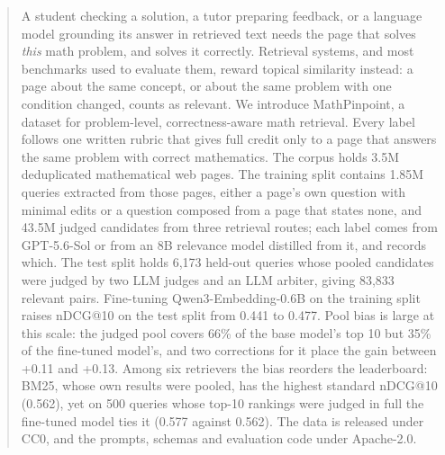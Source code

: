\begin{abstract}
A student checking a solution, a tutor preparing feedback, or a language model grounding its answer in retrieved text needs the page that solves \emph{this} math problem, and solves it correctly. Retrieval systems, and most benchmarks used to evaluate them, reward topical similarity instead: a page about the same concept, or about the same problem with one condition changed, counts as relevant. We introduce MathPinpoint, a dataset for problem-level, correctness-aware math retrieval. Every label follows one written rubric that gives full credit only to a page that answers the same problem with correct mathematics. The corpus holds 3.5M deduplicated mathematical web pages. The training split contains 1.85M queries extracted from those pages, either a page's own question with minimal edits or a question composed from a page that states none, and 43.5M judged candidates from three retrieval routes; each label comes from GPT-5.6-Sol or from an 8B relevance model distilled from it, and records which. The test split holds 6,173 held-out queries whose pooled candidates were judged by two LLM judges and an LLM arbiter, giving 83,833 relevant pairs. Fine-tuning Qwen3-Embedding-0.6B on the training split raises nDCG@10 on the test split from 0.441 to 0.477. Pool bias is large at this scale: the judged pool covers 66\% of the base model's top 10 but 35\% of the fine-tuned model's, and two corrections for it place the gain between +0.11 and +0.13. Among six retrievers the bias reorders the leaderboard: BM25, whose own results were pooled, has the highest standard nDCG@10 (0.562), yet on 500 queries whose top-10 rankings were judged in full the fine-tuned model ties it (0.577 against 0.562). The data is released under CC0, and the prompts, schemas and evaluation code under Apache-2.0.
\end{abstract}

